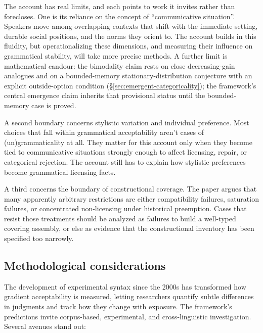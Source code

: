 \documentclass[12pt,letterpaper]{article}
\begin{document}
The account has real limits, and each points to work it invites rather than forecloses. One is its reliance on the concept of \enquote{communicative situation}. Speakers move among overlapping contexts that shift with the immediate setting, durable social positions, and the norms they orient to. The account builds in this fluidity, but operationalizing these dimensions, and measuring their influence on grammatical stability, will take more precise methods. A further limit is mathematical candour: the bimodality claim rests on close decreasing-gain analogues and on a bounded-memory stationary-distribution conjecture with an explicit outside-option condition (\S\ref{sec:emergent-categoricality}); the framework's central emergence claim inherits that provisional status until the bounded-memory case is proved.

A second boundary concerns stylistic variation and individual preference. Most choices that fall within grammatical acceptability aren't cases of (un)grammaticality at all. They matter for this account only when they become tied to communicative situations strongly enough to affect licensing, repair, or categorical rejection. The account still has to explain how stylistic preferences become grammatical licensing facts.

A third concerns the boundary of constructional coverage. The paper argues that many apparently arbitrary restrictions are either compatibility failures, saturation failures, or concentrated non-licensing under historical preemption. Cases that resist those treatments should be analyzed as failures to build a well-typed covering assembly, or else as evidence that the constructional inventory has been specified too narrowly.

\subsection{Methodological considerations}\label{sec:Methodological-Considerations}

The development of experimental syntax since the 2000s \autocite{schutze2016} has transformed how gradient acceptability is measured, letting researchers quantify subtle differences in judgments and track how they change with exposure. The framework's predictions invite corpus-based, experimental, and cross-linguistic investigation. Several avenues stand out:
\end{document}
